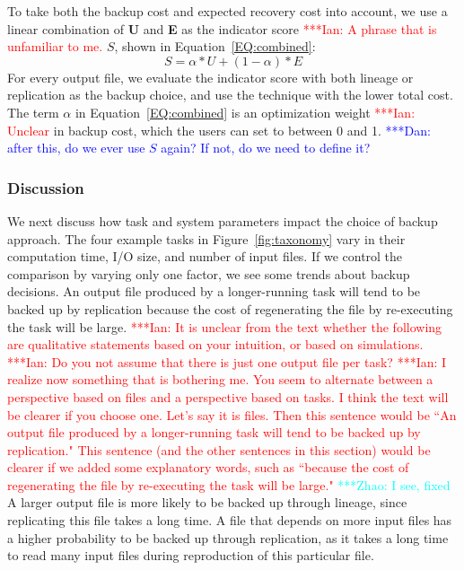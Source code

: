 \documentclass{sig-alternate}
\newcommand{\iannote}[1]{ {\textcolor{red}    { ***Ian:      #1 }}}
\newcommand{\katznote}[1]{ {\textcolor{blue}    { ***Dan:      #1 }}}
\newcommand{\zhaonote}[1]{{\textcolor{cyan}    { ***Zhao:      #1 }}}
\newcommand{\iannote}[1]{}
\newcommand{\katznote}[1]{}
\newcommand{\zhaonote}[1]{}
\begin{document}
To take both the backup cost and expected recovery cost into account, we use a linear combination of {\bf U} and {\bf E} as the indicator score\iannote{A phrase that is unfamiliar to me.} $S$, shown in Equation~\ref{EQ:combined}:
\begin{equation}
S=\alpha*U+(1-\alpha)*E
\label{EQ:combined}
\end{equation}
%
For every output file, we evaluate the indicator score with both lineage or replication as the backup choice, and use the technique with the lower total cost.
The term $\alpha$ in Equation~\ref{EQ:combined} is an optimization weight \iannote{Unclear} in backup cost, which the users can set to between 0 and 1. \katznote{after this, do we ever use $S$ again?  If not, do we need to define it?}

\subsubsection{Discussion}
We next discuss how task and system parameters impact the choice of backup approach.
The four example tasks in Figure~\ref{fig:taxonomy} vary in their computation time, I/O size, and number of input files. If we control the comparison by varying only one factor, we see some trends about backup decisions.
An output file produced by a longer-running task will tend to be backed up by replication because the cost of regenerating the file by re-executing the task will be large.
\iannote{It is unclear from the text whether the following are qualitative statements based on your intuition, or based on simulations.}
\iannote{Do you not assume that there is just one output file per task?} 
\iannote{I realize now something that is bothering me. You seem to alternate between a perspective based on files and a perspective based on tasks. I think the text will be clearer if you choose one. Let's say it is files. Then this sentence would be ``An output file produced by a longer-running task will tend to be backed up by replication." This sentence (and the other sentences in this section) would be clearer if we added some explanatory words, such as ``because the cost of regenerating the file by re-executing the task will be large."}\zhaonote{I see, fixed}
A larger output file is more likely to be backed up through lineage, since replicating this file takes a long time.
A file that depends on more input files has a higher probability to be backed up through replication, as it takes a long time to read many input files during reproduction of this particular file.
\end{document}
